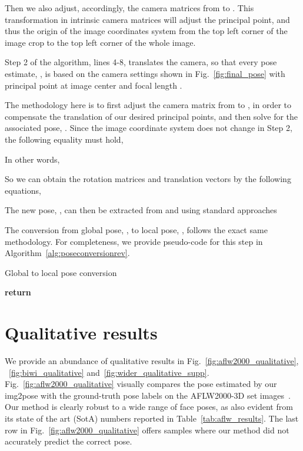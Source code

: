 \documentclass[final]{cvpr}
\begin{document}
Then we also adjust, accordingly, the camera matrices from  to . This transformation in intrinsic camera matrices will adjust the principal point, and thus the origin of the image coordinates system from the top left corner of the image crop to the top left corner of the whole image. 

Step 2 of the algorithm, lines 4-8, translates the camera, so that every pose estimate, , is based on the camera settings shown in Fig.~\ref{fig:final_pose} with principal point at image center and focal length . 

The methodology here is to first adjust the camera matrix from  to , in order to compensate the translation of our desired principal points, and then solve for the associated pose, . Since the image coordinate system does not change in Step 2, the following equality must hold,


In other words,

So we can obtain the rotation matrices  and translation vectors  by the following equations,


The new pose, , can then be extracted from  and  using standard approaches~\cite{rodrigues, hartley2003multiple}

The conversion from global pose, , to local pose, , follows the exact same methodology. For completeness, we provide pseudo-code for this step in Algorithm~\ref{alg:poseconversionrev}.
\begin{algorithm}[h]
\caption{Global to local pose conversion}
\label{alg:poseconversionrev}
\begin{algorithmic}[1]
	    \State 
	    \State 
	    \State 
	    \State 
	    \State 
	    \State 
	    \State 
	    \State \textbf{return}   
	\EndProcedure
\end{algorithmic}
\end{algorithm}



\section{Qualitative results}\label{sec:append:qual}
We provide an abundance of qualitative results in Fig.~\ref{fig:aflw2000_qualitative}, ~\ref{fig:biwi_qualitative} and~\ref{fig:wider_qualitative_supp}.
Fig.~\ref{fig:aflw2000_qualitative} visually compares the pose estimated by our img2pose with the ground-truth pose labels on the AFLW2000-3D set images~\cite{3ddfa}. Our method is clearly robust to a wide range of face poses, as also evident from its state of the art (SotA) numbers reported in Table~\ref{tab:aflw_results}. The last row in Fig.~\ref{fig:aflw2000_qualitative} offers samples where our method did not accurately predict the correct pose. 
\end{document}
